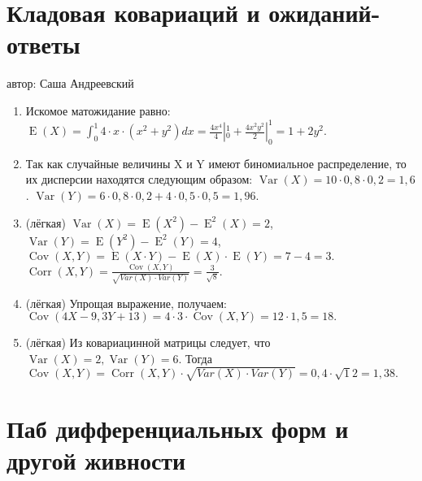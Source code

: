 \documentclass[a4paper,12pt]{article}
\DeclareMathOperator{\Cov}{Cov}
\DeclareMathOperator{\cov}{\Cov}
\DeclareMathOperator{\Corr}{Corr}
\DeclareMathOperator{\Var}{Var}
\DeclareMathOperator{\E}{E}
\begin{document}
\newpage
\section{Кладовая ковариаций и ожиданий-ответы}
автор: Саша Андреевский

\begin{enumerate}
\item Искомое матожидание равно:
$\E(X) = \int_0^1 4 \cdot x \cdot (x^2 + y^2)dx = \frac{4x^4}{4}|_0^1 + \frac{4x^2y^2}{2}|_0^1= 1 + 2y^2.$
\item Так как случайные величины X и Y имеют биномиальное распределение, то их дисперсии находятся следующим образом:
$\Var(X)=10\cdot0,8\cdot0,2=1,6$. $\Var(Y)=6\cdot0,8\cdot0,2 + 4\cdot0,5\cdot0,5=1,96$.
\item (лёгкая) $\Var(X)=\E(X^2)-\E^2(X)=2$,$ \Var(Y)=\E(Y^2)-\E^2(Y)=4$, $\Cov(X,Y)=\E(X\cdot Y)-\E(X)\cdot \E(Y)=7-4=3.$ $\Corr(X,Y)=\frac{\cov(X,Y)}{\sqrt{Var(X)\cdot Var(Y)}}=\frac{3}{\sqrt 8}$.

\item (лёгкая) Упрощая выражение, получаем: $\Cov(4X-9,  3Y+13)=4 \cdot 3 \cdot \Cov(X, Y) = 12 \cdot 1,5 = 18.$
\item (лёгкая) Из ковариацинной матрицы следует, что $\Var(X)=2, \Var(Y)=6$.  Тогда $\Cov(X,Y)=\Corr(X,Y) \cdot \sqrt{Var(X)\cdot Var(Y)} = 0,4 \cdot \sqrt 12 = 1,38.$
\end{enumerate}


\newpage
\section{Паб дифференциальных форм и другой живности} %
\end{document}
